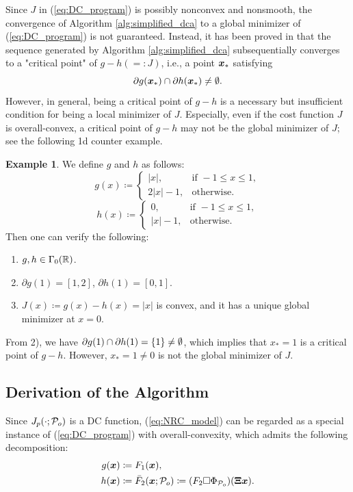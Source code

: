 \documentclass[lettersize,journal]{IEEEtran}
\theoremstyle{plain}%
\theoremstyle{definition}
\newtheorem{example}{Example}
\theoremstyle{remark}
\begin{document}
Since $J$ in (\ref{eq:DC_program}) is possibly nonconvex and nonsmooth, the convergence of Algorithm \ref{alg:simplified_dca} to a global minimizer of (\ref{eq:DC_program}) is not guaranteed. Instead, it has been proved in \cite{pham1997} that the sequence generated by Algorithm \ref{alg:simplified_dca} subsequentially converges to a "critical point" of $g-h(=:J)$, i.e., a point $\bm{x}_{*}$ satisfying
\[\partial g(\bm{x}_{*})\cap\partial h(\bm{x}_*)\neq \emptyset.\]
However, in general, being a critical point of $g-h$ is a necessary but insufficient condition for being a local minimizer of $J$. Especially, even if the cost function $J$ is overall-convex, a critical point of $g-h$ may not be the global minimizer of $J$; see the following 1d counter example.

\begin{example}\label{exp:critical_is_not_global_minimizer}
We define $g$ and $h$ as follows:
\begin{equation*}
g(x)\coloneqq \begin{cases}
|x|, & \textrm{if }-1\leq x\leq 1,\\
2|x|-1, & \textrm{otherwise}.
\end{cases}
\end{equation*}
\begin{equation*}
h(x)\coloneqq \begin{cases}
0, &\textrm{if }-1\leq x\leq 1,\\
|x|-1, & \textrm{otherwise}.
\end{cases}
\end{equation*}
Then one can verify the following:
\begin{enumerate}
\item $g,h\in\Gamma_0(\mathbb{R})$.
\item $\partial g(1)=[1,2]$, $\partial h(1)=[0,1]$.
\item $J(x)\coloneqq g(x)-h(x)=|x|$ is convex, and it has a unique global minimizer at $x=0$.
\end{enumerate}
From 2), we have $\partial g(1)\cap\partial h(1)=\left\{ 1 \right\}\neq \emptyset$, which implies that $x_*=1$ is a critical point of $g-h$. However, $x_*=1\neq 0$ is not the global minimizer of $J$.
\end{example}

\subsection{Derivation of the Algorithm}
Since $J_{p}(\cdot;\mathcal{P}_o)$ is a DC function, (\ref{eq:NRC_model}) can be regarded as a special instance of (\ref{eq:DC_program}) with overall-convexity, which admits the following decomposition:
\begin{align}
g(\bm{x}) &\coloneqq F_1(\bm{x}),\nonumber\\
h(\bm{x}) &\coloneqq \bar{F}_2(\bm{x};\mathcal{P}_o)\coloneqq (F_2\Box \Phi_{\mathcal{P}_o})(\bm{\Xi} \bm{x}).\label{eq:F2_bar}
\end{align}
\end{document}
